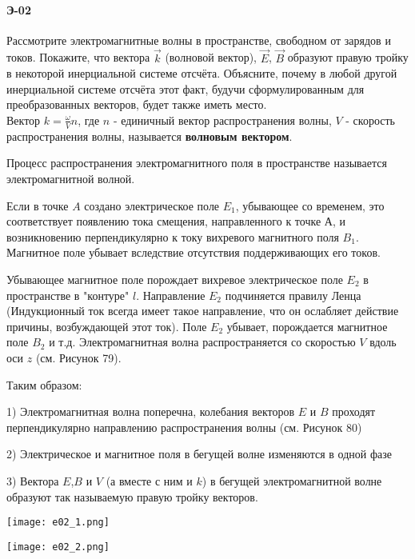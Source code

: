 \documentclass[__main__.tex]{subfiles}
\begin{document}
\paragraph{Э-02}
Рассмотрите электромагнитные волны в пространстве, свободном от зарядов и токов. Покажите, что вектора $\vec{k}$ (волновой вектор), $\vec{E}$, $\vec{B}$ образуют правую тройку в некоторой инерциальной системе отсчёта. Объясните, почему в любой другой инерциальной системе отсчёта этот факт, будучи сформулированным для преобразованных векторов, будет также иметь место.\\

Вектор $k = \frac{\omega}{V} n$, где $n$ - единичный вектор распространения волны, $V$ - скорость распространения волны, называется \textbf{волновым вектором}.

Процесс распространения электромагнитного поля в пространстве называется электромагнитной волной. 

Если в точке $A$ создано электрическое поле $E_1$, убывающее со временем, это соответствует появлению тока смещения, направленного к точке А, и возникновению перпендикулярно к току вихревого магнитного поля $B_1$. Магнитное поле убывает вследствие отсутствия поддерживающих его токов.

Убывающее магнитное поле порождает вихревое электрическое поле $E_2$ в пространстве в "контуре" $l$. Направление $E_2$ подчиняется правилу Ленца (Индукционный ток всегда имеет такое направление, что он ослабляет действие причины, возбуждающей этот ток). Поле $E_2$ убывает, порождается магнитное поле $B_2$ и т.д. Электромагнитная волна распространяется со скоростью $V$ вдоль оси $z$ (см. Рисунок 79). 

Таким образом:

1) Электромагнитная волна поперечна, колебания векторов $E$ и $B$ проходят перпендикулярно направлению распространения волны (см. Рисунок 80)

2) Электрическое и магнитное поля в бегущей волне изменяются в одной фазе

3) Вектора $E$,$B$ и $V$ (а вместе с ним и $k$) в бегущей электромагнитной волне образуют так называемую правую тройку векторов.

\begin{center}
	\texttt{[image: e02\_1.png]}
\end{center}

\begin{center}
	\texttt{[image: e02\_2.png]}
\end{center}
\end{document}
